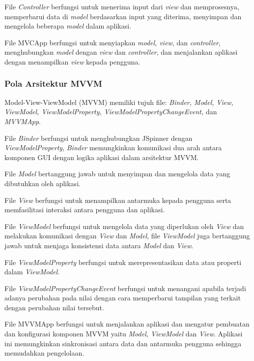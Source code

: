 \documentclass[conference]{IEEEtran}
\begin{document}
	File \textit{Controller} berfungsi untuk menerima input dari \textit{view} dan memprosesnya, memperbarui data di \textit{model} berdasarkan input yang diterima, menyimpan dan mengelola beberapa \textit{model} dalam aplikasi. 
	
	File MVCApp berfungsi untuk menyiapkan \textit{model, view}, dan \textit{controller}, menghubungkan \textit{model} dengan \textit{view} dan \textit{controller}, dan menjalankan aplikasi dengan menampilkan \textit{view} kepada pengguna. 
	
	\subsubsection{Pola Arsitektur MVVM}
	Model-View-ViewModel (MVVM) memiliki tujuh file: \textit{Binder, Model, View, ViewModel, ViewModelProperty, ViewModelPropertyChangeEvent,} dan \textit{MVVMApp}. 
	
	File \textit{Binder} berfungsi untuk menghubungkan JSpinner dengan \textit{ViewModelProperty}, \textit{Binder} memungkinkan komunikasi dua arah antara komponen GUI dengan logika aplikasi dalam arsitektur MVVM.
	
	File \textit{Model} bertanggung jawab untuk menyimpan dan mengelola data yang dibutuhkan oleh aplikasi.
	
	File \textit{View} berfungsi untuk menampilkan antarmuka kepada pengguna serta memfasilitasi interaksi antara pengguna dan aplikasi.
	
	File \textit{ViewModel} berfungsi untuk mengelola data yang diperlukan oleh \textit{View} dan melakukan komunikasi dengan \textit{View} dan \textit{Model}, file \textit{ViewModel} juga bertanggung jawab untuk menjaga konsistensi data antara \textit{Model} dan \textit{View}. 
	
	File \textit{ViewModelProperty} berfungsi untuk merepresentasikan data atau properti dalam \textit{ViewModel}.
	
	File \textit{ViewModelPropertyChangeEvent} berfungsi untuk menangani apabila terjadi adanya perubahan pada nilai dengan cara memperbarui tampilan yang terkait dengan perubahan nilai tersebut. 
	
	File MVVMApp berfungsi untuk menjalankan aplikasi dan mengatur pembuatan dan konfigurasi 
	komponen MVVM yaitu \textit{Model, ViewModel} dan \textit{View}. Aplikasi ini memungkinkan sinkronisasi antara data dan antarmuka pengguna sehingga memudahkan pengelolaan.
	
\end{document}
